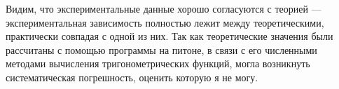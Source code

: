 \documentclass[a4paper,12pt]{article}
\theoremstyle{plain} %
\theoremstyle{definition} %
\theoremstyle{remark} %
\begin{document}
			Видим, что экспериментальные данные хорошо согласуются с теорией --- экспериментальная зависимость полностью лежит между теоретическими, практически совпадая с одной из них. Так как теоретические значения были рассчитаны с помощью программы на питоне, в связи с его численными методами вычисления тригонометрических функций, могла возникнуть систематическая погрешность, оценить которую я не могу.
			
\end{document}

